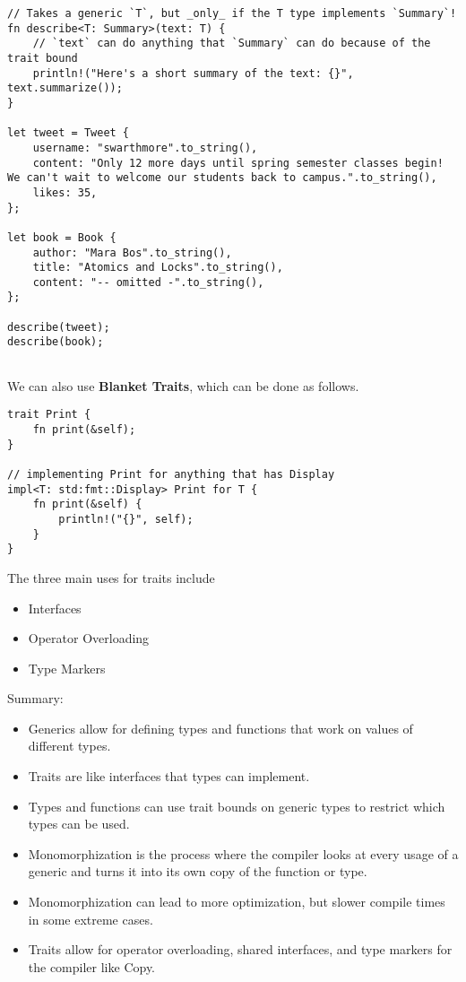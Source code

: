 \begin{lstlisting}[frame = none]
// Takes a generic `T`, but _only_ if the T type implements `Summary`!
fn describe<T: Summary>(text: T) {
    // `text` can do anything that `Summary` can do because of the trait bound
    println!("Here's a short summary of the text: {}", text.summarize());
}

let tweet = Tweet {
    username: "swarthmore".to_string(),
    content: "Only 12 more days until spring semester classes begin! We can't wait to welcome our students back to campus.".to_string(),
    likes: 35,
};

let book = Book {
    author: "Mara Bos".to_string(),
    title: "Atomics and Locks".to_string(),
    content: "-- omitted -".to_string(),
};

describe(tweet);
describe(book);
    
\end{lstlisting}

We can also use \textbf{Blanket Traits}, which can be done as follows.

\begin{lstlisting}[frame = none]
trait Print {
    fn print(&self);
}

// implementing Print for anything that has Display
impl<T: std:fmt::Display> Print for T {
    fn print(&self) {
        println!("{}", self);
    }
}
\end{lstlisting}

The three main uses for traits include
\begin{itemize}
    \item Interfaces
    \item Operator Overloading
    \item Type Markers
\end{itemize} 

Summary: 
\begin{itemize}
    \item Generics allow for defining types and functions that work on values of different types.
    \item Traits are like interfaces that types can implement.
    \item Types and functions can use trait bounds on generic types to restrict which types can be used.
    \item Monomorphization is the process where the compiler looks at every usage of a generic and turns it into its own copy of the function or type.
    \item Monomorphization can lead to more optimization, but slower compile times in some extreme cases.
    \item Traits allow for operator overloading, shared interfaces, and type markers for the compiler like Copy.
\end{itemize}
